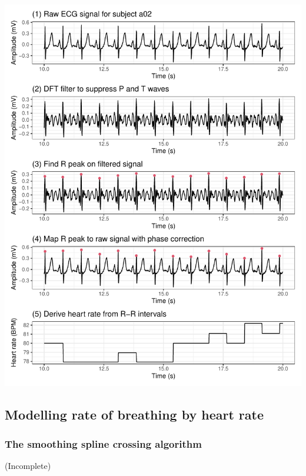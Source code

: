\documentclass[
]{article}
\begin{document}
\begin{center}\includegraphics{report_files/figure-latex/ecg-process-1} \end{center}

\hypertarget{modelling-rate-of-breathing-by-heart-rate}{%
\subsection{Modelling rate of breathing by heart
rate}\label{modelling-rate-of-breathing-by-heart-rate}}

\hypertarget{the-smoothing-spline-crossing-algorithm}{%
\subsubsection{The smoothing spline crossing
algorithm}\label{the-smoothing-spline-crossing-algorithm}}

(Incomplete)
\end{document}
